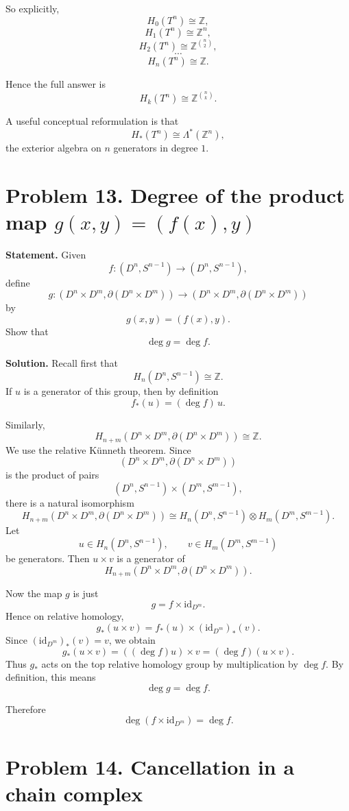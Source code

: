 \documentclass[12pt,a4paper]{article}
\theoremstyle{notespace}
\begin{document}
So explicitly,
\[
H_0(T^n)\cong \mathbb Z,
\]
\[
H_1(T^n)\cong \mathbb Z^n,
\]
\[
H_2(T^n)\cong \mathbb Z^{\binom{n}{2}},
\]
\[
\cdots
\]
\[
H_n(T^n)\cong \mathbb Z.
\]

Hence the full answer is
\[
\boxed{H_k(T^n)\cong \mathbb Z^{\binom{n}{k}}.}
\]

A useful conceptual reformulation is that
\[
H_*(T^n)\cong \Lambda^*(\mathbb Z^n),
\]
the exterior algebra on \(n\) generators in degree \(1\).



\section{Problem 13. Degree of the product map \(g(x,y)=(f(x),y)\)}

\textbf{Statement.}
Given
\[
f:(D^n,S^{n-1})\to (D^n,S^{n-1}),
\]
define
\[
g:(D^n\times D^m,\partial(D^n\times D^m))\to (D^n\times D^m,\partial(D^n\times D^m))
\]
by
\[
g(x,y)=(f(x),y).
\]
Show that
\[
\deg g=\deg f.
\]

\medskip

\textbf{Solution.}
Recall first that
\[
H_n(D^n,S^{n-1})\cong \mathbb Z.
\]
If \(u\) is a generator of this group, then by definition
\[
f_*(u)=(\deg f)\,u.
\]

Similarly,
\[
H_{n+m}(D^n\times D^m,\partial(D^n\times D^m))\cong \mathbb Z.
\]
We use the relative K\"unneth theorem. Since
\[
(D^n\times D^m,\partial(D^n\times D^m))
\]
is the product of pairs
\[
(D^n,S^{n-1})\times (D^m,S^{m-1}),
\]
there is a natural isomorphism
\[
H_{n+m}(D^n\times D^m,\partial(D^n\times D^m))
\cong
H_n(D^n,S^{n-1})\otimes H_m(D^m,S^{m-1}).
\]
Let
\[
u\in H_n(D^n,S^{n-1}),\qquad v\in H_m(D^m,S^{m-1})
\]
be generators. Then \(u\times v\) is a generator of
\[
H_{n+m}(D^n\times D^m,\partial(D^n\times D^m)).
\]

Now the map \(g\) is just
\[
g=f\times \mathrm{id}_{D^m}.
\]
Hence on relative homology,
\[
g_*(u\times v)=f_*(u)\times (\mathrm{id}_{D^m})_*(v).
\]
Since \((\mathrm{id}_{D^m})_*(v)=v\), we obtain
\[
g_*(u\times v)=((\deg f)u)\times v=(\deg f)(u\times v).
\]
Thus \(g_*\) acts on the top relative homology group by multiplication by \(\deg f\). By definition, this means
\[
\deg g=\deg f.
\]

Therefore
\[
\boxed{\deg(f\times \mathrm{id}_{D^m})=\deg f.}
\]

\section{Problem 14. Cancellation in a chain complex}
\end{document}
